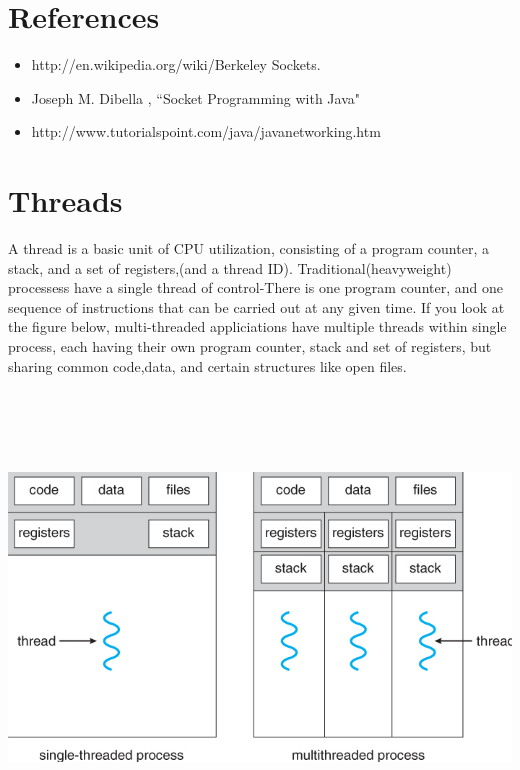 \documentclass[12pt]{extarticle}
\begin{document}
\section{References}

\begin{itemize}

    \item http://en.wikipedia.org/wiki/Berkeley Sockets.
    \item Joseph M. Dibella ,  “Socket Programming with Java"
    \item http://www.tutorialspoint.com/java/javanetworking.htm
    
\end{itemize}

\newpage

\section{Threads}

A thread is a basic unit of CPU utilization, consisting of a program counter, a stack, and a set of registers,(and a thread ID).
Traditional(heavyweight) processess have a single thread of control-There is one program counter, and one sequence of instructions that can
be carried out at any given time. If you look at the figure below, multi-threaded appliciations have multiple
threads within single process, each having their own program counter, stack and set of registers, but sharing
common code,data, and certain structures like open files.


\begin{center}

    \includegraphics[width=15cm, height=12cm]{thread}
     
\end{center} 
\end{document}
